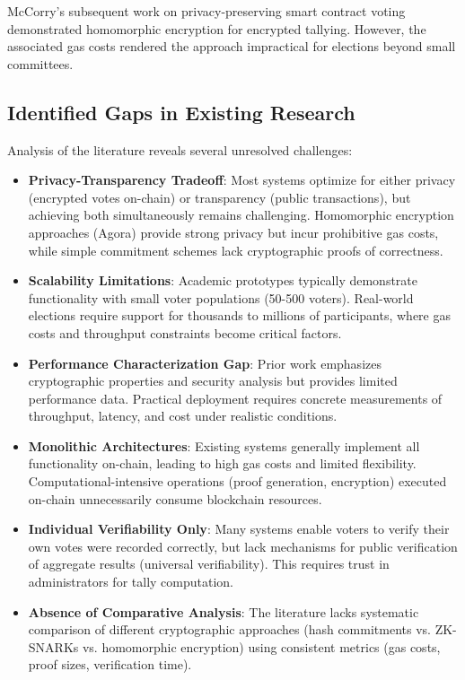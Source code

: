 \documentclass[conference]{IEEEtran}
\begin{document}
McCorry's subsequent work on privacy-preserving smart contract voting \cite{ethereum_voting} demonstrated homomorphic encryption for encrypted tallying. However, the associated gas costs rendered the approach impractical for elections beyond small committees.

\subsection{Identified Gaps in Existing Research}

Analysis of the literature reveals several unresolved challenges:

\begin{itemize}
    \item \textbf{Privacy-Transparency Tradeoff}: Most systems optimize for either privacy (encrypted votes on-chain) or transparency (public transactions), but achieving both simultaneously remains challenging. Homomorphic encryption approaches (Agora) provide strong privacy but incur prohibitive gas costs, while simple commitment schemes lack cryptographic proofs of correctness.
    
    \item \textbf{Scalability Limitations}: Academic prototypes typically demonstrate functionality with small voter populations (50-500 voters). Real-world elections require support for thousands to millions of participants, where gas costs and throughput constraints become critical factors.
    
    \item \textbf{Performance Characterization Gap}: Prior work emphasizes cryptographic properties and security analysis but provides limited performance data. Practical deployment requires concrete measurements of throughput, latency, and cost under realistic conditions.
    
    \item \textbf{Monolithic Architectures}: Existing systems generally implement all functionality on-chain, leading to high gas costs and limited flexibility. Computational-intensive operations (proof generation, encryption) executed on-chain unnecessarily consume blockchain resources.
    
    \item \textbf{Individual Verifiability Only}: Many systems enable voters to verify their own votes were recorded correctly, but lack mechanisms for public verification of aggregate results (universal verifiability). This requires trust in administrators for tally computation.
    
    \item \textbf{Absence of Comparative Analysis}: The literature lacks systematic comparison of different cryptographic approaches (hash commitments vs. ZK-SNARKs vs. homomorphic encryption) using consistent metrics (gas costs, proof sizes, verification time).
\end{itemize}
\end{document}
